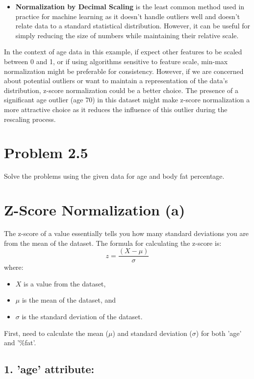 \documentclass{article}
\begin{document}
\begin{enumerate}
\begin{itemize}
    \item \textbf{Normalization by Decimal Scaling} is the least common method used in practice for machine learning as it doesn't handle outliers well and doesn't relate data to a standard statistical distribution. However, it can be useful for simply reducing the size of numbers while maintaining their relative scale.

  \end{itemize}

  In the context of age data in this example, if expect other features to be scaled between 0 and 1, or if using algorithms sensitive to feature scale, min-max normalization might be preferable for consistency. However, if we are concerned about potential outliers or want to maintain a representation of the data's distribution, z-score normalization could be a better choice. The presence of a significant age outlier (age 70) in this dataset might make z-score normalization a more attractive choice as it reduces the influence of this outlier during the rescaling process.
\end{enumerate}

\section*{Problem 2.5}
Solve the problems using the given data for age and body fat percentage.

\section*{Z-Score Normalization (a)}

The z-score of a value essentially tells you how many standard deviations you are from the mean of the dataset. The formula for calculating the z-score is:
\[
z = \frac{(X - \mu)}{\sigma}
\]
where:
\begin{itemize}
  \item $X$ is a value from the dataset,
  \item $\mu$ is the mean of the dataset, and
  \item $\sigma$ is the standard deviation of the dataset.
\end{itemize}

First, need to calculate the mean ($\mu$) and standard deviation ($\sigma$) for both 'age' and '\%fat'.

\subsection*{1. 'age' attribute:}
\end{document}
